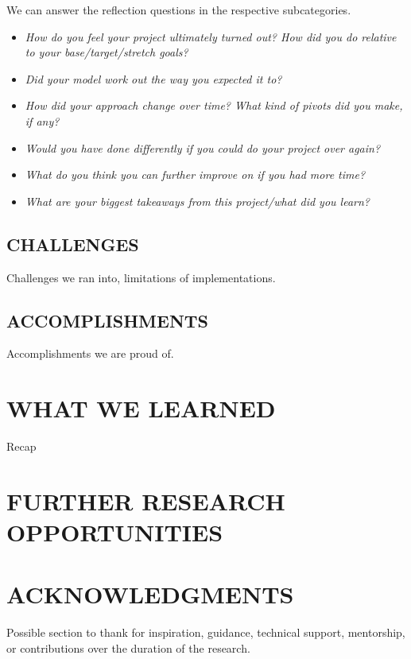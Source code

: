 \documentclass[%
 reprint,
 amsmath,amssymb,
 aps,
]{revtex4-1}
\begin{document}
We can answer the reflection questions in the respective subcategories.

\begin{itemize}
	\item \textit{How do you feel your project ultimately turned out? How did you do relative to your base/target/stretch goals?}
	\item \textit{Did your model work out the way you expected it to?}
	\item \textit{How did your approach change over time? What kind of pivots did you make, if any?}
	\item \textit{Would you have done differently if you could do your project over again?}
	\item \textit{What do you think you can further improve on if you had more time?}
	\item \textit{What are your biggest takeaways from this project/what did you learn?}
\end{itemize}


\subsection{\label{sec:level2}CHALLENGES}
Challenges we ran into, limitations of implementations.

\subsection{\label{sec:level2}ACCOMPLISHMENTS}
Accomplishments we are proud of.

\section{\label{sec:level1}WHAT WE LEARNED}
Recap

\section{\label{sec:level1}FURTHER RESEARCH OPPORTUNITIES}



\section{\label{sec:level1}ACKNOWLEDGMENTS}
Possible section to thank for inspiration, guidance, technical support, mentorship, or contributions over the duration of the research. 
\end{document}
